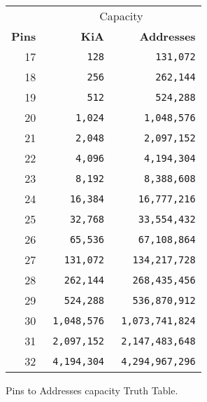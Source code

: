 \begin{figure}[H]
\begin{minipage}[t]{0.49\linewidth}
{\begin{tabular}{rrr}
  \toprule    
\end{tabular}%
}
\end{minipage}%
\begin{minipage}[t]{0.49\linewidth}
{ 
\setlength{\tabcolsep}{3.0pt}
\setlength\cmidrulewidth{\heavyrulewidth} %
\begin{tabular}{rrr}

  & \multicolumn{2}{c}{Capacity} \\
  \cmidrule(lr){2-3}
  
 
 \textbf{Pins} & \textbf{KiA} & \textbf{Addresses}\\               
            
  \toprule    
17   &    \texttt{128}           &      \texttt{131,072} \\
18  &    \texttt{ 256}           &      \texttt{ 262,144} \\
19   &    \texttt{512}           &\texttt{524,288}    \\
20           &\texttt{1,024}            &      \texttt{1,048,576} \\
21           &    \texttt{2,048} &\texttt{2,097,152}    \\
22           &    \texttt{4,096} &\texttt{4,194,304}    \\
23            &    \texttt{8,192} &      \texttt{8,388,608} \\
24           &    \texttt{16,384} &\texttt{16,777,216}    \\
25           &    \texttt{32,768} &      \texttt{33,554,432} \\
26            &\texttt{65,536}            &\texttt{67,108,864}    \\
27           &\texttt{131,072}            &\texttt{134,217,728}    \\
28           &    \texttt{262,144} &\texttt{268,435,456}    \\
29          &    \texttt{524,288} &\texttt{536,870,912}    \\
30          &    \texttt{1,048,576} &      \texttt{1,073,741,824} \\
31          &    \texttt{2,097,152} &      \texttt{2,147,483,648} \\
32          &    \texttt{ 4,194,304} &      \texttt{ 4,294,967,296} \\
  \toprule    
\end{tabular}%
}
\end{minipage}
\caption*{Pins to Addresses capacity Truth Table.}
\end{figure}

